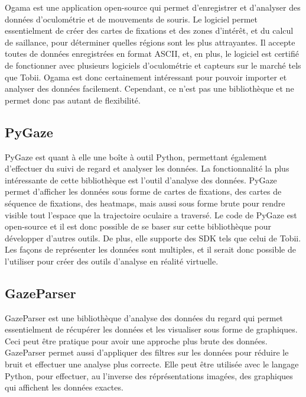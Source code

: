 \documentclass[12pt]{article}
\begin{document}
Ogama \cite{ogama} est une application open-source qui permet d'enregistrer et
d'analyser des données d'oculométrie et de mouvements de souris. Le logiciel
permet essentielment de créer des cartes de fixations et des zones d'intérêt,
et du calcul de saillance, pour déterminer quelles régions sont les plus
attrayantes. Il accepte toutes de données enregistrées en format ASCII, et, en
plus, le logiciel est certifié de fonctionner avec plusieurs logiciels
d'oculométrie et capteurs sur le marché tels que Tobii. Ogama est donc
certainement intéressant pour pouvoir importer et analyser des données
facilement. Cependant, ce n'est pas une bibliothèque et ne permet donc pas
autant de flexibilité.

\subsection{PyGaze}

PyGaze \cite{pygaze} est quant à elle une boîte à outil Python, permettant
également d'effectuer du suivi de regard et analyser les données. La
fonctionnalité la plus intéressante de cette bibliothèque est l'outil
d'analyse des données. PyGaze permet d'afficher les données sous forme de
cartes de fixations, des cartes de séquence de fixations, des heatmaps,
mais aussi sous forme brute pour rendre visible tout l'espace que la
trajectoire oculaire a traversé. Le code de PyGaze est open-source et il est
donc possible de se baser sur cette bibliothèque pour développer d'autres
outils. De plus, elle supporte des SDK tels que celui de Tobii. Les façons de
représenter les données sont multiples, et il serait donc possible de
l'utiliser pour créer des outils d'analyse en réalité virtuelle.

\subsection{GazeParser}

GazeParser \cite{gazeparser} est une bibliothèque d'analyse des données du
regard qui permet essentielment de récupérer les données et les visualiser sous
forme de graphiques. Ceci peut être pratique pour avoir une approche plus brute
des données. GazeParser permet aussi d'appliquer des filtres sur les données
pour réduire le bruit et effectuer une analyse plus correcte. Elle peut être
utilisée avec le langage Python, pour effectuer, au l'inverse des
réprésentations imagées, des graphiques qui affichent les données exactes.
\end{document}
